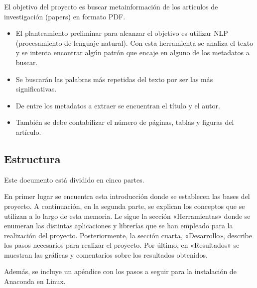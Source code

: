 \documentclass[../main.tex]{subfiles}
\begin{document}
El objetivo del proyecto es buscar metainformación de los artículos de investigación (papers) en formato PDF.

\begin{itemize}
	\item El planteamiento preliminar para alcanzar el objetivo es utilizar NLP (procesamiento de lenguaje natural).
	Con esta herramienta se analiza el texto y se intenta encontrar algún patrón que encaje en alguno de los metadatos a buscar.
	\item Se buscarán las palabras más repetidas del texto por ser las más significativas.
	\item De entre los metadatos a extraer se encuentran el título y el autor.
	\item También se debe contabilizar el número de páginas, tablas y figuras del artículo.
\end{itemize}

\subsection{Estructura}

Este documento está dividido en cinco partes.

En primer lugar se encuentra esta introducción donde se establecen las bases del proyecto.
A continuación, en la segunda parte, se explican los conceptos que se utilizan a lo largo de esta memoria.
Le sigue la sección «Herramientas» donde se enumeran las distintas aplicaciones y librerías que se han empleado para la realización del proyecto.
Posteriormente, la sección cuarta, «Desarrollo», describe los pasos necesarios para realizar el proyecto.
Por último, en «Resultados» se muestran las gráficas y comentarios sobre los resultados obtenidos.

Además, se incluye un apéndice con los pasos a seguir para la instalación de Anaconda en Linux.
\end{document}
